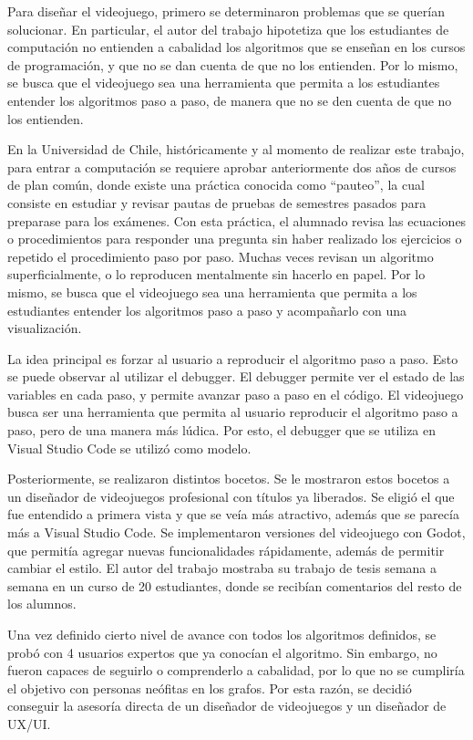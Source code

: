 Para diseñar el videojuego, primero se determinaron problemas que se querían solucionar. En particular, el autor del trabajo hipotetiza que los estudiantes de computación no entienden a cabalidad los algoritmos que se enseñan en los cursos de programación, y que no se dan cuenta de que no los entienden. Por lo mismo, se busca que el videojuego sea una herramienta que permita a los estudiantes entender los algoritmos paso a paso, de manera que no se den cuenta de que no los entienden.

En la Universidad de Chile, históricamente y al momento de realizar este trabajo, para entrar a computación se requiere aprobar anteriormente dos años de cursos de plan común, donde existe una práctica conocida como ``pauteo'', la cual consiste en estudiar y revisar pautas de pruebas de semestres pasados para preparase para los exámenes. Con esta práctica, el alumnado revisa las ecuaciones o procedimientos para responder una pregunta sin haber realizado los ejercicios o repetido el procedimiento paso por paso. Muchas veces revisan un algoritmo superficialmente, o lo reproducen mentalmente sin hacerlo en papel. Por lo mismo, se busca que el videojuego sea una herramienta que permita a los estudiantes entender los algoritmos paso a paso y acompañarlo con una visualización.

La idea principal es forzar al usuario a reproducir el algoritmo paso a paso. Esto se puede observar al utilizar el debugger. El debugger permite ver el estado de las variables en cada paso, y permite avanzar paso a paso en el código. El videojuego busca ser una herramienta que permita al usuario reproducir el algoritmo paso a paso, pero de una manera más lúdica. Por esto, el debugger que se utiliza en Visual Studio Code se utilizó como modelo.


Posteriormente, se realizaron distintos bocetos. Se le mostraron estos bocetos a un diseñador de videojuegos profesional con títulos ya liberados. Se eligió el que fue entendido a primera vista y que se veía más atractivo, además que se parecía más a Visual Studio Code. Se implementaron versiones del videojuego con Godot, que permitía agregar nuevas funcionalidades rápidamente, además de permitir cambiar el estilo. El autor del trabajo mostraba su trabajo de tesis semana a semana en un curso de 20 estudiantes, donde se recibían comentarios del resto de los alumnos.

Una vez definido cierto nivel de avance con todos los algoritmos definidos, se probó con 4 usuarios expertos que ya conocían el algoritmo. Sin embargo, no fueron capaces de seguirlo o comprenderlo a cabalidad, por lo que no se cumpliría el objetivo con personas neófitas en los grafos. Por esta razón, se decidió conseguir la asesoría directa de un diseñador de videojuegos y un diseñador de UX/UI.

